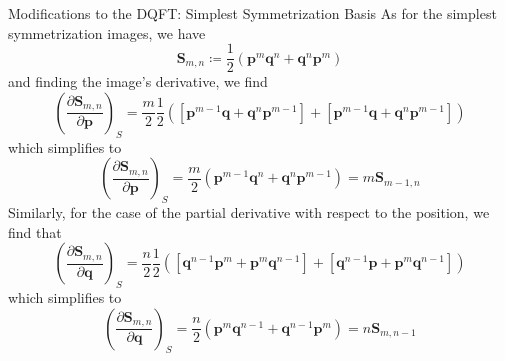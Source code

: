\documentclass[aspectratio=169]{beamer}
\begin{document}
\begin{frame}[allowframebreaks]{Modifications to the DQFT: Simplest Symmetrization Basis}
		As for the simplest symmetrization images, we have
		\begin{equation}
			\textbf{S}_{m,n}\coloneqq\frac{1}{2}(\textbf{p}^m\textbf{q}^n+\textbf{q}^n\textbf{p}^m)
		\end{equation}
		and finding the image's derivative, we find
		\begin{equation}
			\left(\frac{\partial\textbf{S}_{m,n}}{\partial\textbf{p}}\right)_S=\frac{m}{2}\frac{1}{2}\left( [\textbf{p}^{m-1}\textbf{q}+\textbf{q}^n\textbf{p}^{m-1}]+[\textbf{p}^{m-1}\textbf{q}+\textbf{q}^n\textbf{p}^{m-1}]\right) 
		\end{equation}
		which simplifies to
		\begin{equation}
			\left(\frac{\partial\textbf{S}_{m,n}}{\partial\textbf{p}}\right)_S=\frac{m}{2}\left(\textbf{p}^{m-1}\textbf{q}^n+\textbf{q}^n\textbf{p}^{m-1}\right) =m\textbf{S}_{m-1,n}
		\end{equation}
		Similarly, for the case of the partial derivative with respect to the position, we find that
		\begin{equation}
			\left(\frac{\partial\textbf{S}_{m,n}}{\partial\textbf{q}}\right)_S=\frac{n}{2}\frac{1}{2}\left( [\textbf{q}^{n-1}\textbf{p}^m+\textbf{p}^m\textbf{q}^{n-1}]+[\textbf{q}^{n-1}\textbf{p}+\textbf{p}^m\textbf{q}^{n-1}]\right) 
		\end{equation}
		which simplifies to
		\begin{equation}
			\left(\frac{\partial\textbf{S}_{m,n}}{\partial\textbf{q}}\right)_S=\frac{n}{2}\left(\textbf{p}^{m}\textbf{q}^{n-1}+\textbf{q}^{n-1}\textbf{p}^{m}\right) =n\textbf{S}_{m,n-1}
		\end{equation}
		

\end{frame}
\end{document}
